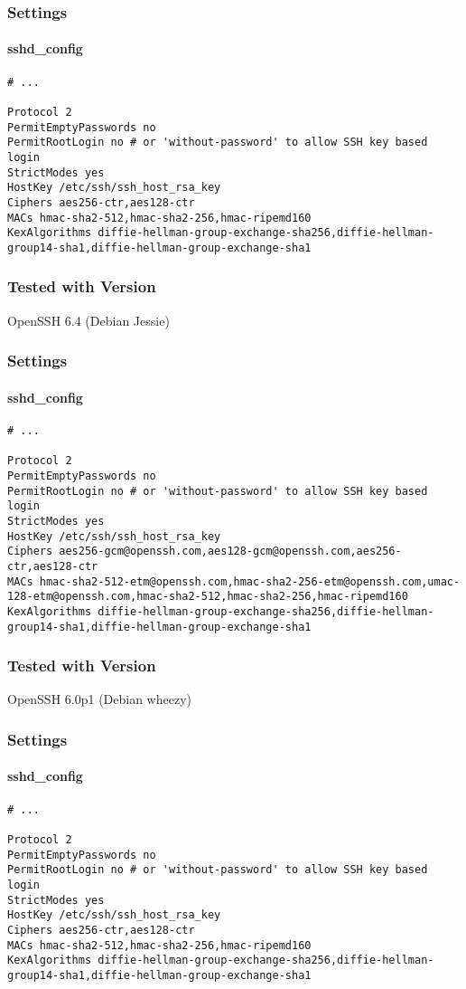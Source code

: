 \subsubsection{Settings}
\paragraph*{sshd\_config}
\begin{lstlisting}[breaklines]
# ...

Protocol 2
PermitEmptyPasswords no
PermitRootLogin no # or 'without-password' to allow SSH key based login
StrictModes yes
HostKey /etc/ssh/ssh_host_rsa_key
Ciphers aes256-ctr,aes128-ctr
MACs hmac-sha2-512,hmac-sha2-256,hmac-ripemd160
KexAlgorithms diffie-hellman-group-exchange-sha256,diffie-hellman-group14-sha1,diffie-hellman-group-exchange-sha1
\end{lstlisting}
\subsubsection{Tested with Version} OpenSSH 6.4 (Debian Jessie)
\subsubsection{Settings}
\paragraph*{sshd\_config}
\begin{lstlisting}[breaklines]
# ...

Protocol 2
PermitEmptyPasswords no
PermitRootLogin no # or 'without-password' to allow SSH key based login
StrictModes yes
HostKey /etc/ssh/ssh_host_rsa_key
Ciphers aes256-gcm@openssh.com,aes128-gcm@openssh.com,aes256-ctr,aes128-ctr
MACs hmac-sha2-512-etm@openssh.com,hmac-sha2-256-etm@openssh.com,umac-128-etm@openssh.com,hmac-sha2-512,hmac-sha2-256,hmac-ripemd160
KexAlgorithms diffie-hellman-group-exchange-sha256,diffie-hellman-group14-sha1,diffie-hellman-group-exchange-sha1
\end{lstlisting}
\subsubsection{Tested with Version} OpenSSH 6.0p1 (Debian wheezy)
\subsubsection{Settings}
\paragraph*{sshd\_config}
\begin{lstlisting}[breaklines]
# ...

Protocol 2
PermitEmptyPasswords no
PermitRootLogin no # or 'without-password' to allow SSH key based login
StrictModes yes
HostKey /etc/ssh/ssh_host_rsa_key
Ciphers aes256-ctr,aes128-ctr
MACs hmac-sha2-512,hmac-sha2-256,hmac-ripemd160
KexAlgorithms diffie-hellman-group-exchange-sha256,diffie-hellman-group14-sha1,diffie-hellman-group-exchange-sha1
\end{lstlisting}

